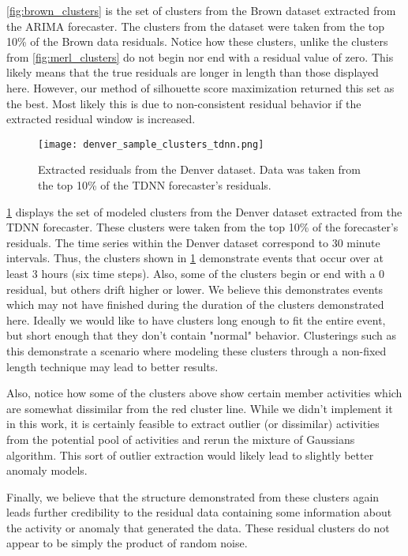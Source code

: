 \ref{fig:brown_clusters} is the set of clusters from the Brown dataset extracted from the ARIMA forecaster.  The clusters from the dataset were taken from the top 10\% of the Brown data residuals.  Notice how these clusters, unlike the clusters from \ref{fig:merl_clusters} do not begin nor end with a residual value of zero.  This likely means that the true residuals are longer in length than those displayed here.  However, our method of silhouette score maximization returned this set as the best.  Most likely this is due to non-consistent residual behavior if the extracted residual window is increased.
  
\begin{figure}
	\begin{center}
		\texttt{[image: denver\_sample\_clusters\_tdnn.png]}
	\end{center}
	\caption{Extracted residuals from the Denver dataset.  Data was taken from the top 10\% of the TDNN forecaster's residuals.}
	\label{fig:denver_clusters}
\end{figure}

\ref{fig:denver_clusters} displays the set of modeled clusters from the Denver dataset extracted from the TDNN forecaster.  These clusters were taken from the top 10\% of the forecaster's residuals.  The time series within the Denver dataset correspond to 30 minute intervals.  Thus, the clusters shown in \ref{fig:denver_clusters} demonstrate events that occur over at least 3 hours (six time steps).  Also, some of the clusters begin or end with a 0 residual, but others drift higher or lower.  We believe this demonstrates events which may not have finished during the duration of the clusters demonstrated here.  Ideally we would like to have clusters long enough to fit the entire event, but short enough that they don't contain "normal" behavior.  Clusterings such as this demonstrate a scenario where modeling these clusters through a non-fixed length technique may lead to better results.

Also, notice how some of the clusters above show certain member activities which are somewhat dissimilar from the red cluster line.  While we didn't implement it in this work, it is certainly feasible to extract outlier (or dissimilar) activities from the potential pool of activities and rerun the mixture of Gaussians algorithm.  This sort of outlier extraction would likely lead to slightly better anomaly models.

Finally, we believe that the structure demonstrated from these clusters again leads further credibility to the residual data containing some information about the activity or anomaly that generated the data.  These residual clusters do not appear to be simply the product of random noise.  


